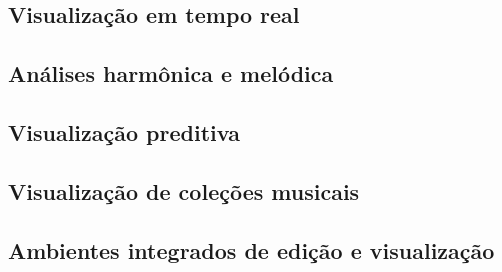 \documentclass{sciposter}
\begin{document}
\begin{multicols}{3}
\subsection{Visualização em tempo real}

\subsection{Análises harmônica e melódica}

\subsection{Visualização preditiva}

\subsection{Visualização de coleções musicais}

\subsection{Ambientes integrados de edição e visualização}

\end{multicols}
\end{document}
